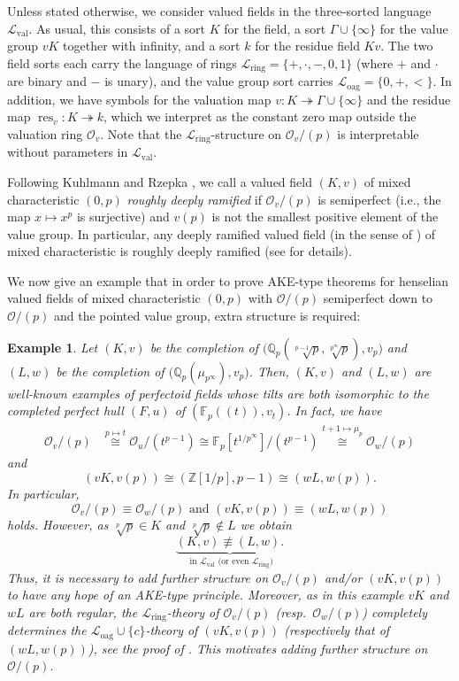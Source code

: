 \documentclass[a4paper]{amsart}
\theoremstyle{mystyle2}
\theoremstyle{mystyle}
\newtheorem{examp}[thm]{Example}
\DeclareMathOperator{\res}{res}
\renewcommand{\L}{\mathcal{L}}
\newcommand{\Lring}{\L_{\mathrm{ring}}}
\newcommand{\Loag}{\L_{\mathrm{oag}}}
\newcommand{\Lval}{\L_{\mathrm{val}}}
\renewcommand{\O}{\mathcal{O}}
\numberwithin{equation}{section}
\begin{document}
Unless stated otherwise, we consider valued fields 
in the three-sorted language $\mathcal{L}_\mathrm{val}$.
As usual, this consists of 
a sort $K$ for the field,
a sort $\Gamma\cup\{\infty\}$ for the value group $vK$ together with infinity,
and a sort $k$ for the residue field $Kv$.
The two field sorts each carry the language of rings
$\mathcal{L}_\mathrm{ring} = \{+,\cdot,-,0,1\}$ 
(where $+$ and $\cdot$ are binary and $-$ is unary),
and the value group sort carries $\mathcal{L}_\mathrm{oag} = \{0, +, <\}$.
In addition, we have symbols for
the valuation map $v \colon K \twoheadrightarrow \Gamma \cup \{ \infty \}$ and the residue map
$\res_v \colon K \twoheadrightarrow k$, which we interpret as the constant zero map outside the valuation ring $\mathcal{O}_v$. Note that the $\Lring$-structure on
$\O_v/(p)$ is interpretable without parameters in $\Lval$.

Following Kuhlmann and Rzepka \cite{KuhlBla}, we call a valued field
$(K,v)$
of mixed characteristic $(0,p)$ \emph{roughly deeply ramified} if $\mathcal{O}_v/(p)$
is semiperfect (i.e., the map $x \mapsto x^p$ is surjective) and $v(p)$ is not the smallest positive element of the value group. In particular, any deeply ramified
valued field (in the sense of \cite{GR}) of mixed characteristic is roughly deeply ramified (see \cite[Introduction]{KuhlBla} for details).

We now give an example that in order to prove AKE-type theorems for henselian
valued fields of mixed characteristic $(0,p)$ with $\O/(p)$ semiperfect
down to $\O/(p)$ and the pointed value group, extra structure is required:
\begin{examp} \label{ex:structure}
    Let $(K,v)$ be the completion of $ {\big(\mathbb{Q}_p(\sqrt[p-1]{p},\sqrt[p^\infty]{p}),v_p\big)}$ 
    and 
    $(L,w)$ be the completion of ${\big(\mathbb{Q}_p(\mu_{p^\infty}),v_p\big)}$. Then, $(K,v)$ and $(L,w)$ are well-known 
    examples of perfectoid fields
    whose tilts are both isomorphic to
    the completed perfect hull $(F,u)$ of $(\mathbb{F}_p(\!(t)\!),v_t)$.
    In fact, we have
    \begin{align*}\O_v/(p) & \overset{{p} \mapsto t}{\cong} \O_u/(t^{p-1}) \cong \mathbb{F}_p[t^{1/p^\infty}]/(t^{p-1}) \overset{t+1 \mapsto \mu_p}{\cong} 
    \mathcal{O}_w/(p)
    \end{align*}
    and $$(vK,v(p)) \cong (\mathbb{Z}[1/p],p-1)\cong (wL,w(p)).$$
    In particular,
    $$\O_v/(p) \equiv \O_w/(p) \textrm{ and }(vK,v(p))\equiv (wL,w(p))$$
    holds.
    However, as $\sqrt[p]{p} \in K$ and $\sqrt[p]{p} \notin L$ we obtain 
    $$\underbrace{(K,v) \not\equiv (L,w).}_{\textrm{ in }\Lval \textrm{ (or even $\Lring$)}}$$
    Thus, it is necessary to add further structure on $\O_v/(p)$ and/or $(vK,v(p))$
    to have any hope of an AKE-type principle. Moreover, as in this example 
    $vK$ and $wL$ are both
    regular, the $\Lring$-theory of $\O_v/(p)$ (resp.~$\O_w/(p)$) completely
    determines the $\Loag\cup\{c\}$-theory of $(vK,v(p))$ (respectively that of $(wL,w(p))$), see the proof of \cite[Theorem 5.1.2]{jahnke-kartas2023beyond}. 
    This motivates adding further structure on $\mathcal{O}/(p)$.
\end{examp}
\end{document}
